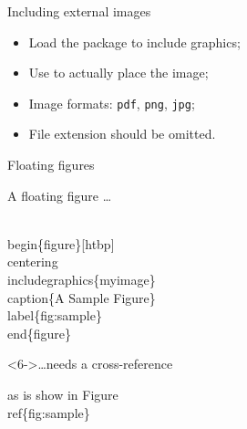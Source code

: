 \begin{frame}[fragile]{Including external images}

  \begin{itemize}
    \item Load the  package to include graphics;
    \item Use  to actually place the image;
    \item Image formats: \texttt{pdf}, \texttt{png}, \texttt{jpg};
    \item File extension should be omitted.
  \end{itemize}
  
  \vspace{1 em}

\end{frame}

\begin{frame}[fragile]{Floating figures}

  \begin{block}{A floating figure \dots}
\begin{semiverbatim}
\\begin\{figure\}\alert<2>{[htbp]}
\alert<3>{\\centering}
\\includegraphics\{myimage\}
\alert<4>{\\caption\{A Sample Figure\}}
\alert<5>{\\label\{fig:sample\}}
\\end\{figure\}
\end{semiverbatim}
  \end{block}
  
  \begin{block}<6->{\ldots needs a cross-reference}
\begin{semiverbatim}
as is show in Figure~\alert<6>{\\ref\{fig:sample\}}
\end{semiverbatim}
  \end{block}

\end{frame}

